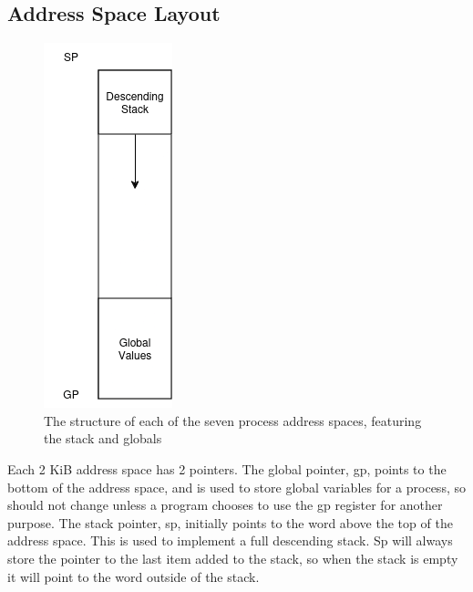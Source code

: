\subsection{Address Space Layout}
\begin{figure}[H]
    \includegraphics[height=0.3\textheight]{figures/addr_space.png}
    \centering
    \caption[Process Address Space]{The structure of each of the seven process address spaces, featuring the stack and globals}
\end{figure}
Each 2 KiB address space has 2 pointers. The global pointer, gp, points to the bottom of the address space, and is used to store global variables for a process, so should not change unless a program chooses to use the gp register for another purpose. The stack pointer, sp, initially points to the word above the top of the address space. This is used to implement a full descending stack. Sp will always store the pointer to the last item added to the stack, so when the stack is empty it will point to the word outside of the stack.

